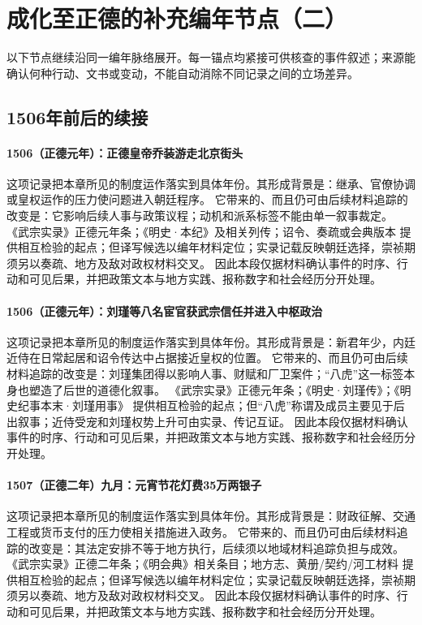 \section{成化至正德的补充编年节点（二）}
以下节点继续沿同一编年脉络展开。每一锚点均紧接可供核查的事件叙述；来源能确认何种行动、文书或变动，不能自动消除不同记录之间的立场差异。

\subsection{1506年前后的续接}

\paragraph{1506（正德元年）：正德皇帝乔装游走北京街头} 这项记录把本章所见的制度运作落实到具体年份。其形成背景是：继承、官僚协调或皇权运作的压力使问题进入朝廷程序。 它带来的、而且仍可由后续材料追踪的改变是：它影响后续人事与政策议程；动机和派系标签不能由单一叙事裁定。 《武宗实录》正德元年条；《明史·本纪》及相关列传；诏令、奏疏或会典版本 提供相互检验的起点；但译写候选以编年材料定位；实录记载反映朝廷选择，崇祯期须另以奏疏、地方及敌对政权材料交叉。 因此本段仅据材料确认事件的时序、行动和可见后果，并把政策文本与地方实践、报称数字和社会经历分开处理。

\paragraph{1506（正德元年）：刘瑾等八名宦官获武宗信任并进入中枢政治} 这项记录把本章所见的制度运作落实到具体年份。其形成背景是：新君年少，内廷近侍在日常起居和诏令传达中占据接近皇权的位置。 它带来的、而且仍可由后续材料追踪的改变是：刘瑾集团得以影响人事、财赋和厂卫案件；“八虎”这一标签本身也塑造了后世的道德化叙事。 《武宗实录》正德元年条；《明史·刘瑾传》；《明史纪事本末·刘瑾用事》 提供相互检验的起点；但“八虎”称谓及成员主要见于后出叙事；近侍受宠和刘瑾权势上升可由实录、传记互证。 因此本段仅据材料确认事件的时序、行动和可见后果，并把政策文本与地方实践、报称数字和社会经历分开处理。

\paragraph{1507（正德二年）九月：元宵节花灯费35万两银子} 这项记录把本章所见的制度运作落实到具体年份。其形成背景是：财政征解、交通工程或货币支付的压力使相关措施进入政务。 它带来的、而且仍可由后续材料追踪的改变是：其法定安排不等于地方执行，后续须以地域材料追踪负担与成效。 《武宗实录》正德二年条；《明会典》相关条目；地方志、黄册/契约/河工材料 提供相互检验的起点；但译写候选以编年材料定位；实录记载反映朝廷选择，崇祯期须另以奏疏、地方及敌对政权材料交叉。 因此本段仅据材料确认事件的时序、行动和可见后果，并把政策文本与地方实践、报称数字和社会经历分开处理。

